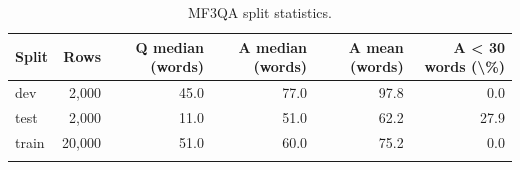 \begin{table}[h]
\caption{MF3QA split statistics.}\label{tab:mf3qa_splits}
\begin{tabular}{@{}lrrrrr@{}}
\toprule
Split & Rows & Q median (words) & A median (words) & A mean (words) & A < 30 words (\textbackslash{}\%) \\
\midrule
dev & 2,000 & 45.0 & 77.0 & 97.8 & 0.0 \\
test & 2,000 & 11.0 & 51.0 & 62.2 & 27.9 \\
train & 20,000 & 51.0 & 60.0 & 75.2 & 0.0 \\
\botrule
\end{tabular}
\end{table}
